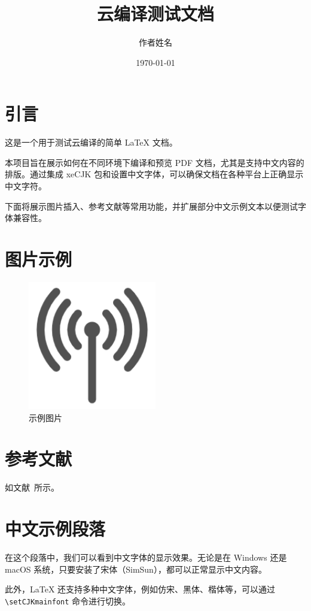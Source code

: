\documentclass{article}
\title{云编译测试文档}
\author{作者姓名}
\date{\today}
\begin{document}
\maketitle

\section{引言}
这是一个用于测试云编译的简单 LaTeX 文档。

本项目旨在展示如何在不同环境下编译和预览 PDF 文档，尤其是支持中文内容的排版。通过集成 xeCJK 包和设置中文字体，可以确保文档在各种平台上正确显示中文字符。

下面将展示图片插入、参考文献等常用功能，并扩展部分中文示例文本以便测试字体兼容性。

\section{图片示例}
\begin{figure}[h]
    \centering
    \includegraphics[width=0.5\textwidth]{figures/figure1.png}
    \caption{示例图片}
    \label{fig:example}
\end{figure}

\section{参考文献}
如文献~\cite{testref}所示。




\section{中文示例段落}
在这个段落中，我们可以看到中文字体的显示效果。无论是在 Windows 还是 macOS 系统，只要安装了宋体（SimSun），都可以正常显示中文内容。

此外，LaTeX 还支持多种中文字体，例如仿宋、黑体、楷体等，可以通过 \texttt{\textbackslash setCJKmainfont} 命令进行切换。
\end{document}
